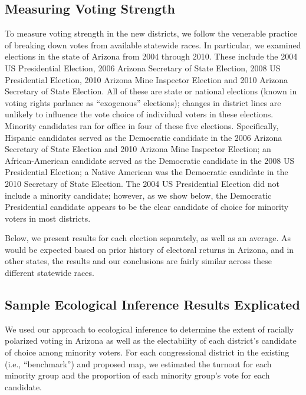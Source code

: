 \documentclass[12pt,draft]{scrartcl}
\begin{document}
\subsection{Measuring Voting Strength}

To measure voting strength in the new districts, we follow the
venerable practice of breaking down votes from available statewide
races.  In particular, we examined elections in the state of Arizona
from 2004 through 2010. These include the 2004 US Presidential
Election, 2006 Arizona Secretary of State Election, 2008 US
Presidential Election, 2010 Arizona Mine Inspector Election and 2010
Arizona Secretary of State Election.  All of these are state or
national elections (known in voting rights parlance as ``exogenous''
elections); changes in district lines are unlikely to influence the
vote choice of individual voters in these elections. Minority
candidates ran for office in four of these five elections.
Specifically, Hispanic candidates served as the Democratic candidate
in the 2006 Arizona Secretary of State Election and 2010 Arizona Mine
Inspector Election; an African-American candidate served as the
Democratic candidate in the 2008 US Presidential Election; a Native
American was the Democratic candidate in the 2010 Secretary of State
Election. The 2004 US Presidential Election did not include a minority
candidate; however, as we show below, the Democratic Presidential
candidate appears to be the clear candidate of choice for minority
voters in most districts.  

Below, we present results for each election separately, as well as an
average.  As would be expected based on prior history of electoral
returns in Arizona, and in other states, the results and our
conclusions are fairly similar across these different statewide races.

\subsection{Sample Ecological Inference Results Explicated}

We used our approach to ecological inference to determine the extent
of racially polarized voting in Arizona as well as the electability of
each district's candidate of choice among minority voters. For each
congressional district in the existing (i.e., ``benchmark'') and
proposed map, we estimated the turnout for each minority group and the
proportion of each minority group's vote for each candidate. 
\end{document}
